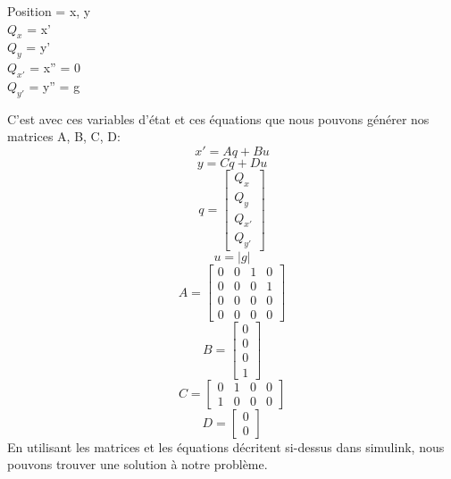\documentclass{article}
\begin{document}
\begin{center}
	Position = x, y\\
    $Q_x$ = x'\\
    $Q_y$ = y'\\
    $Q_{x'}$ = x'' = 0\\
    $Q_{y'}$ = y'' = g\\
\end{center}
C'est avec ces variables d'état et ces équations que nous pouvons générer nos matrices A, B, C, D:
\begin{equation}
	x' = Aq + Bu
\end{equation}
\begin{equation}
   	y = Cq + Du
\end{equation}
\begin{equation}
	q = 
	\begin{bmatrix}
    	Q_x\\
        Q_y\\
        Q_{x'}\\
        Q_{y'}
    \end{bmatrix}
\end{equation}
\begin{equation}
   	u = |g|
\end{equation}
\begin{equation}
	A =
    \begin{bmatrix}
    	0 & 0 & 1 & 0\\
        0 & 0 & 0 & 1\\
        0 & 0 & 0 & 0\\
        0 & 0 & 0 & 0
    \end{bmatrix}
\end{equation}
\begin{equation}
	B =
    \begin{bmatrix}
    	0\\
        0\\
        0\\
        1
    \end{bmatrix}
\end{equation}
\begin{equation}
	C =
    \begin{bmatrix}
    	0 & 1 & 0 & 0\\
        1 & 0 & 0 & 0
    \end{bmatrix}
\end{equation}
\begin{equation}
	D =
    \begin{bmatrix}
    	0\\
        0
    \end{bmatrix}
\end{equation}
En utilisant les matrices et les équations décritent si-dessus dans simulink, nous pouvons trouver une solution à notre problème.
\end{document}
